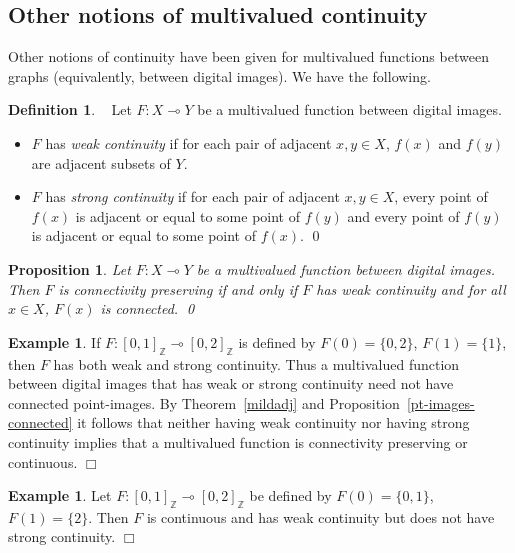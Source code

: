 \documentclass{article}
\theoremstyle{plain}
\newtheorem{prop}[thm]{Proposition}
\theoremstyle{definition}
\newtheorem{definition}[thm]{Definition}
\newtheorem{exl}[thm]{Example}
\numberwithin{thm}{section}
\def\Z{{\mathbb Z}}
\begin{document}
\subsection{Other notions of multivalued continuity}
Other notions of continuity have been given
for multivalued functions between graphs (equivalently,
between digital images). We have the following.

\begin{definition}
\rm{~\cite{Tsaur}}
\label{Tsaur-def}
Let $F: X \multimap Y$ be a multivalued function between
digital images.
\begin{itemize}
\item $F$ has {\em weak continuity} if for each pair of
      adjacent $x,y \in X$, $f(x)$ and $f(y)$ are adjacent
      subsets of $Y$.
\item $F$ has {\em strong continuity} if for each pair of
      adjacent $x,y \in X$, every point of $f(x)$ is adjacent
      or equal to some point of $f(y)$ and every point of 
      $f(y)$ is adjacent or equal to some point of $f(x)$.
     \qed
\end{itemize}
\end{definition}

\begin{prop}
\label{mild-and-weak}
\rm{\cite{BoxSta16}}
Let $F: X \multimap Y$ be a multivalued function between
digital images. Then $F$ is connectivity preserving if and
only if $F$ has weak continuity and for all $x \in X$,
$F(x)$ is connected. \qed
\end{prop}

\begin{exl}
\rm{\cite{BoxSta16}}
\label{pt-images-discon}
If $F: [0,1]_{\Z} \multimap [0,2]_{\Z}$ is defined by
$F(0)=\{0,2\}$, $F(1)=\{1\}$, then $F$ has both weak and
strong continuity. Thus a multivalued function between
digital images that has weak or strong continuity need not
have connected point-images. By Theorem~\ref{mildadj} and
Proposition~\ref{pt-images-connected} it
follows that neither having weak continuity nor having
strong continuity implies that a multivalued function is
connectivity preserving or continuous.
$\Box$
\end{exl}

\begin{exl}
\rm{\cite{BoxSta16}}
Let $F: [0,1]_{\Z} \multimap [0,2]_{\Z}$ be defined by
$F(0)=\{0,1\}$, $F(1)=\{2\}$. Then $F$ is continuous and
has weak continuity but
does not have strong continuity. $\Box$
\end{exl}
\end{document}
